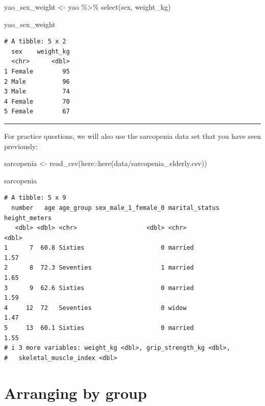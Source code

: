 \documentclass[
  letterpaper,
  DIV=11,
  numbers=noendperiod]{scrreprt}
\newenvironment{Shaded}{\begin{snugshade}}{\end{snugshade}}
\newcommand{\FunctionTok}[1]{\textcolor[rgb]{0.28,0.35,0.67}{#1}}
\newcommand{\NormalTok}[1]{\textcolor[rgb]{0.00,0.23,0.31}{#1}}
\newcommand{\OtherTok}[1]{\textcolor[rgb]{0.00,0.23,0.31}{#1}}
\newcommand{\SpecialCharTok}[1]{\textcolor[rgb]{0.37,0.37,0.37}{#1}}
\newcommand{\StringTok}[1]{\textcolor[rgb]{0.13,0.47,0.30}{#1}}
\begin{document}
\begin{Shaded}
\begin{Highlighting}[]
\NormalTok{yao\_sex\_weight }\OtherTok{\textless{}{-}} 
\NormalTok{  yao }\SpecialCharTok{\%\textgreater{}\%} 
  \FunctionTok{select}\NormalTok{(sex, weight\_kg)}

\NormalTok{yao\_sex\_weight}
\end{Highlighting}
\end{Shaded}

\begin{verbatim}
# A tibble: 5 x 2
  sex    weight_kg
  <chr>      <dbl>
1 Female        95
2 Male          96
3 Male          74
4 Female        70
5 Female        67
\end{verbatim}

\begin{center}\rule{0.5\linewidth}{0.5pt}\end{center}

For practice questions, we will also use the sarcopenia data set that
you have seen previously:

\begin{Shaded}
\begin{Highlighting}[]
\NormalTok{sarcopenia }\OtherTok{\textless{}{-}} \FunctionTok{read\_csv}\NormalTok{(here}\SpecialCharTok{::}\FunctionTok{here}\NormalTok{(}\StringTok{\textquotesingle{}data/sarcopenia\_elderly.csv\textquotesingle{}}\NormalTok{))}

\NormalTok{sarcopenia}
\end{Highlighting}
\end{Shaded}

\begin{verbatim}
# A tibble: 5 x 9
  number   age age_group sex_male_1_female_0 marital_status height_meters
   <dbl> <dbl> <chr>                   <dbl> <chr>                  <dbl>
1      7  60.8 Sixties                     0 married                 1.57
2      8  72.3 Seventies                   1 married                 1.65
3      9  62.6 Sixties                     0 married                 1.59
4     12  72   Seventies                   0 widow                   1.47
5     13  60.1 Sixties                     0 married                 1.55
# i 3 more variables: weight_kg <dbl>, grip_strength_kg <dbl>,
#   skeletal_muscle_index <dbl>
\end{verbatim}

\hypertarget{arranging-by-group}{%
\section{Arranging by group}\label{arranging-by-group}}
\end{document}
